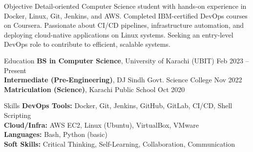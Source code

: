 \documentclass{resume}
\begin{document}

\begin{rSection}{Objective}
Detail-oriented Computer Science student with hands-on experience in Docker, Linux, Git, Jenkins, and AWS. Completed IBM-certified DevOps courses on Coursera. Passionate about CI/CD pipelines, infrastructure automation, and deploying cloud-native applications on Linux systems. Seeking an entry-level DevOps role to contribute to efficient, scalable systems.
\end{rSection}


\begin{rSection}{Education}
\textbf{BS in Computer Science}, University of Karachi (UBIT) \hfill Feb 2023 -- Present \\
\textbf{Intermediate (Pre-Engineering)}, DJ Sindh Govt. Science College \hfill Nov 2022 \\
\textbf{Matriculation (Science)}, Karachi Public School \hfill Oct 2020
\end{rSection}


\begin{rSection}{Skills}
\textbf{DevOps Tools:} Docker, Git, Jenkins, GitHub, GitLab, CI/CD, Shell Scripting \\
\textbf{Cloud/Infra:} AWS EC2, Linux (Ubuntu), VirtualBox, VMware \\
\textbf{Languages:} Bash, Python (basic) \\
\textbf{Soft Skills:} Critical Thinking, Self-Learning, Collaboration, Communication
\end{rSection}

\end{document}

